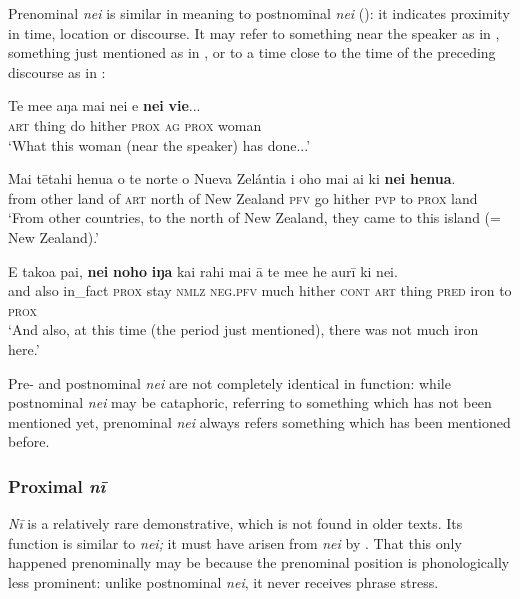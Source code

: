 Prenominal \textit{nei} is similar in meaning to postnominal \textit{nei} (): it indicates proximity in time, location or discourse. It may refer to something near the speaker as in , something just mentioned as in , or to a time close to the time of the preceding discourse as in :

\ea\label{ex:4.219}
\gll Te me{\ꞌ}e aŋa mai nei e \textbf{nei} \textbf{vi{\ꞌ}e}... \\
\textsc{art} thing do hither \textsc{prox} \textsc{ag} \textsc{prox} woman \\

\glt 
‘What this woman (near the speaker) has done...’ \textstyleExampleref{[Mat. 26:12]}
\z

\ea\label{ex:4.220}
\gll Mai tētahi henua o te norte o Nueva Zelántia i oho mai ai  ki \textbf{nei} \textbf{henua}.\\
from other land of \textsc{art} north of New Zealand \textsc{pfv} go hither \textsc{pvp}  to \textsc{prox} land\\

\glt 
‘From other countries, to the north of New Zealand, they came to this island (= New Zealand).’ \textstyleExampleref{[R346.012]} 
\z

\ea\label{ex:4.221}
\gll {\ꞌ}E tako{\ꞌ}a pa{\ꞌ}i, \textbf{nei} \textbf{noho} \textbf{iŋa} kai rahi mai {\ꞌ}ā te me{\ꞌ}e  he {\ꞌ}aurī ki nei.\\
and also in\_fact \textsc{prox} stay \textsc{nmlz} \textsc{neg.pfv} much hither \textsc{cont} \textsc{art} thing  \textsc{pred} iron to \textsc{prox}\\

\glt
‘And also, at this time (the period just mentioned), there was not much iron here.’ \textstyleExampleref{[R353.006]} 
\z

Pre- and postnominal \textit{nei} are not completely identical in function: while postnominal \textit{nei} may be cataphoric, referring to something which has not been mentioned yet, prenominal \textit{nei} always refers something which has been mentioned before.
\subsubsection[Proximal nī]{Proximal \textit{nī}}\label{sec:4.6.4.3}

\textit{Nī} is a relatively rare demonstrative, which is not found in older texts. Its function is similar to \textit{nei;} it must have arisen from \textit{nei} by . That this only happened prenominally may be because the prenominal position is phonologically less prominent: unlike postnominal \textit{nei}, it never receives phrase stress.

